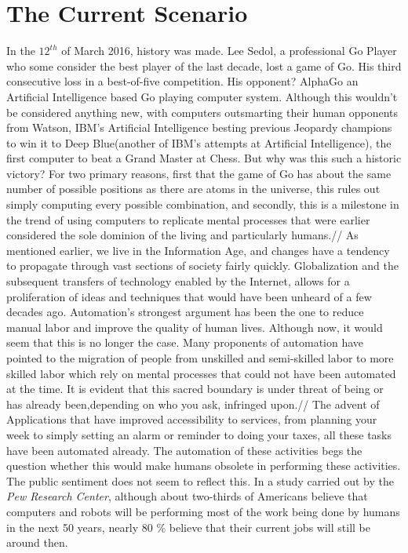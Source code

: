 \section{The Current Scenario}
\label{sec:-current}
In the $12^{th}$ of March 2016, history was made. Lee Sedol, a professional Go Player who some consider the best player of the last decade, lost a game of Go. His third consecutive loss in a best-of-five competition. His opponent? AlphaGo an Artificial Intelligence based Go playing computer system. Although this wouldn't be considered anything new, with computers outsmarting their human opponents from Watson, IBM's Artificial Intelligence besting previous Jeopardy champions to win it to Deep Blue(another of IBM's attempts at Artificial Intelligence), the first computer to beat a Grand Master at Chess. But why was this such a historic victory? For two primary reasons, first that the game of Go has about the same number of possible positions as there are atoms in the universe, this rules out simply computing every possible combination, and secondly, this is a milestone in the trend of using computers to replicate mental processes that were earlier considered the sole dominion of the living and particularly humans.//
	As mentioned earlier, we live in the Information Age, and changes have a tendency to propagate through vast sections of society fairly quickly. Globalization and the subsequent transfers of technology enabled by the Internet, allows for a proliferation of ideas and techniques that would have been unheard of a few decades ago. Automation's strongest argument has been the one to reduce manual labor and improve the quality of human lives. Although now, it would seem that this is no longer the case. Many proponents of automation have pointed to the migration of people from unskilled and semi-skilled labor to more skilled labor which rely on mental processes that could not have been automated at the time. It is evident that this sacred boundary is under threat of being or has already been,depending on who you ask, infringed upon.//
	The advent of Applications that have improved accessibility to services, from planning your week to simply setting an alarm or reminder to doing your taxes, all these tasks have been automated already. The automation of these activities begs the question whether this would make humans obsolete in performing these activities. The public sentiment does not seem to reflect this. In a study carried out by the \textit{Pew Research Center}\cite{workforcepew}, although about two-thirds of Americans believe that computers and robots will be performing most of the work being done by humans in the next 50 years, nearly 80 \% believe that their current jobs will still be around then.\\
